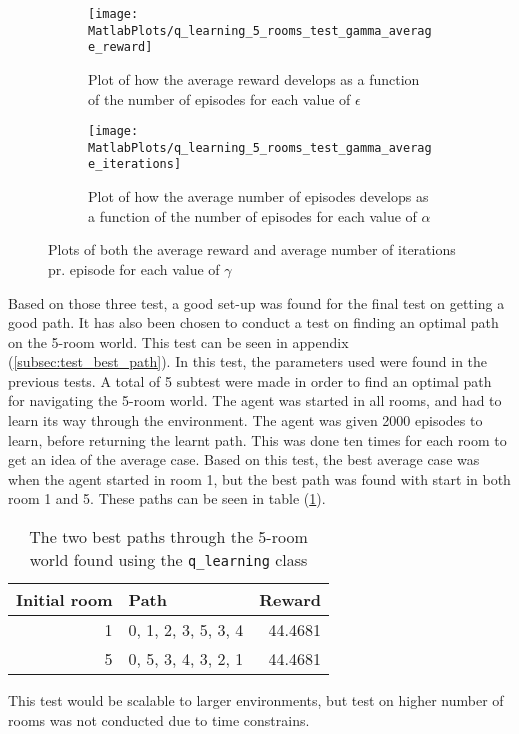 \documentclass[../Head/Main.tex]{subfiles}
\begin{document}
\begin{figure}[H]
	\centering
	\begin{subfigure}[b]{0.49\textwidth}
		\centering
		\texttt{[image: MatlabPlots/q\_learning\_5\_rooms\_test\_gamma\_average\_reward]}
		\caption{Plot of how the average reward develops as a function of the number of episodes for each value of $\epsilon$}
		\label{fig:q-learn_gamma_reward_impl}
	\end{subfigure}
	\hfill
	\begin{subfigure}[b]{0.49\textwidth}
		\centering
		\texttt{[image: MatlabPlots/q\_learning\_5\_rooms\_test\_gamma\_average\_iterations]}
		\caption{Plot of how the average number of episodes develops as a function of the number of episodes for each value of $\alpha$}
		\label{fig:q-learn_gamma_iterations_impl}
	\end{subfigure}
	\caption{Plots of both the average reward and average number of iterations pr. episode for each value of $\gamma$}
	\label{fig:q-learn_gamma_impl}
\end{figure}
Based on those three test, a good set-up was found for the final test on getting a good path. It has also been chosen to conduct a test on finding an optimal path on the 5-room world. This test can be seen in appendix (\ref{subsec:test_best_path}). In this test, the parameters used were found in the previous tests. A total of 5 subtest were made in order to find an optimal path for navigating the 5-room world. The agent was started in all rooms, and had to learn its way through the environment. The agent was given 2000 episodes to learn, before returning the learnt path. This was done ten times for each room to get an idea of the average case. Based on this test, the best average case was when the agent started in room 1, but the best path was found with start in both room 1 and 5. These paths can be seen in table (\ref{tab:q_learn_result}).

\begin{table}[H]
	\centering
	\begin{tabular}{r l r}
	\hline
	\multicolumn{1}{l}{\textbf{Initial room}} & \textbf{Path} & \textbf{Reward} \\ 			\hline
	1  & 0, 1, 2, 3, 5, 3, 4  & 44.4681\\
	5  & 0, 5, 3, 4, 3, 2, 1  & 44.4681\\
	\hline
	\end{tabular}
	\caption{The two best paths through the 5-room world found using the \texttt{q\_learning} class}
	\label{tab:q_learn_result}
\end{table}
This test would be scalable to larger environments, but test on higher number of rooms was not conducted due to time constrains.
\end{document}
